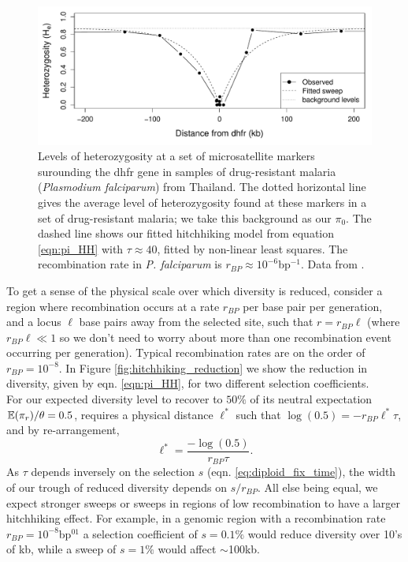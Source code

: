 \begin{figure}
\begin{center}
\includegraphics[width=\textwidth]{Journal_figs/recom_selection/malaria_sweep/dhfr_sweep.pdf}
\end{center}
\caption{Levels of heterozygosity at a set of microsatellite markers
  surounding the dhfr gene in samples of drug-resistant malaria ({\it Plasmodium falciparum}) from
  Thailand. The dotted horizontal line gives the average level of
  heterozygosity found at these markers in a set of drug-resistant
  malaria; we take this background as our $\pi_0$. The dashed line shows
  our fitted hitchhiking model from equation \ref{eqn:pi_HH} with $\tau \approx 40$, fitted by
  non-linear least squares. The recombination rate in {\it P.
    falciparum} is $r_{BP}\approx 10^{-6}$bp$^{-1}$. Data from
  \citet{nash2005selection}. } \label{fig:hitchhiking_malaria}
\end{figure}


To get a sense of the physical scale over which diversity is reduced,
consider a region where recombination occurs at a rate $r_{BP}$ per
base pair per generation, and a locus $ \ell $ base pairs away from the
selected site, such that $r=r_{BP } \ell $ (where $r_{BP}  \ell  \ll 1$ so we don't need to
worry about more than one recombination event occurring per
generation). Typical
recombination rates are on the order of $r_{BP} = 10^{-8}$. In Figure
\ref{fig:hitchhiking_reduction} we show the reduction in diversity,
given by eqn. \eqref{eqn:pi_HH}, for two different selection coefficients.\\ 

For our expected diversity level to recover to $50\%$ of
its neutral expectation $\mathbb{E}(\pi_r)/\theta=0.5$, requires a physical
distance $\ell^{*}$ such that $\log(0.5) = -r_{BP} \ell ^*\tau$, and by re-arrangement,
\begin{equation}
\ell^* = \frac{-\log(0.5)}{r_{BP} \tau }.
\end{equation}
As
$\tau$ depends inversely on the selection $s$ (eqn. \eqref{eq:diploid_fix_time}), the width of our trough of reduced diversity depends on $s/r_{BP}$.
All else being equal, we expect stronger sweeps or sweeps in regions of low
recombination to have a larger hitchhiking effect. For example, in a genomic region with a recombination rate $r_{BP}=10^{-8}$bp$^{01}$ a selection coefficient of $s=0.1\%$ would reduce
diversity over 10's of kb, while a sweep of $s=1\%$ would affect
$\sim$100kb.   \\


